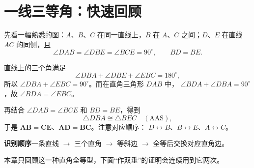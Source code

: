 \setcounter{section}{-1}
\section{一线三等角：快速回顾}
先看一幅熟悉的图：\(A\)、\(B\)、\(C\) 在同一直线上，\(B\) 在 \(A\)、\(C\) 之间；\(D\)、\(E\) 在直线 \(AC\) 的同侧，且
\[
\angle DAB=\angle DBE=\angle BCE=90^\circ,\qquad BD=BE.
\]
\diagram{\diReview}

直线上的三个角满足
\[
\angle DBA+\angle DBE+\angle EBC=180^\circ,
\]
所以 \(\angle DBA+\angle EBC=90^\circ\)。而在直角三角形 \(DAB\) 中，
\(\angle BDA+\angle DBA=90^\circ\)，故 \(\angle BDA=\angle EBC\)。

再结合 \(\angle DAB=\angle BCE\) 和 \(BD=BE\)，得到
\[
\triangle DBA\cong\triangle BEC\quad(\mathrm{AAS}),
\]
于是 \(\boldsymbol{AB=CE}\)、\(\boldsymbol{AD=BC}\)。注意对应顺序：
\(D\leftrightarrow B\)、\(B\leftrightarrow E\)、\(A\leftrightarrow C\)。

\begin{strand}
\textbf{识别顺序}\quad 一条直线 \(\longrightarrow\) 三个直角
\(\longrightarrow\) 等斜边 \(\longrightarrow\) 全等后交换对应直角边。

本章只回顾这一种直角全等型，下面“作双垂”的证明会连续用到它两次。
\end{strand}
\clearpage

